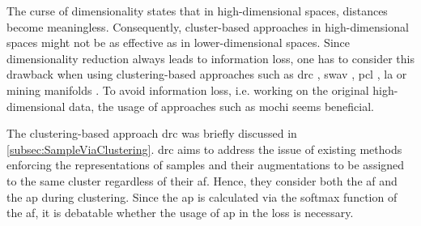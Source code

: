 The curse of dimensionality states that in high-dimensional spaces, distances become meaningless.
Consequently, cluster-based approaches in high-dimensional spaces might not be as effective as in lower-dimensional spaces.
Since dimensionality reduction always leads to information loss, 
one has to consider this drawback when using clustering-based approaches 
such as \ac{drc} \citet{DRC_2020}, \ac{swav} \citet{swav_2020}, \ac{pcl} \citet{PCL_2021}, 
\ac{la} \citet{local_aggr_2019} or mining manifolds \citet{mining_manifolds_2018}.
To avoid information loss, i.e. working on the original high-dimensional data, 
the usage of approaches such as \ac{mochi} \citet{mochi_2020} seems beneficial.

The clustering-based approach \ac{drc} \citet{DRC_2020} was briefly discussed in \autoref{subsec:SampleViaClustering}.
\ac{drc} aims to address the issue of existing methods enforcing the representations of samples 
and their augmentations to be assigned to the same cluster regardless of their \ac{af}.
Hence, they consider both the \ac{af} and the \ac{ap} during clustering.
Since the \ac{ap} is calculated via the softmax function of the \ac{af}, 
it is debatable whether the usage of \ac{ap} in the loss is necessary.